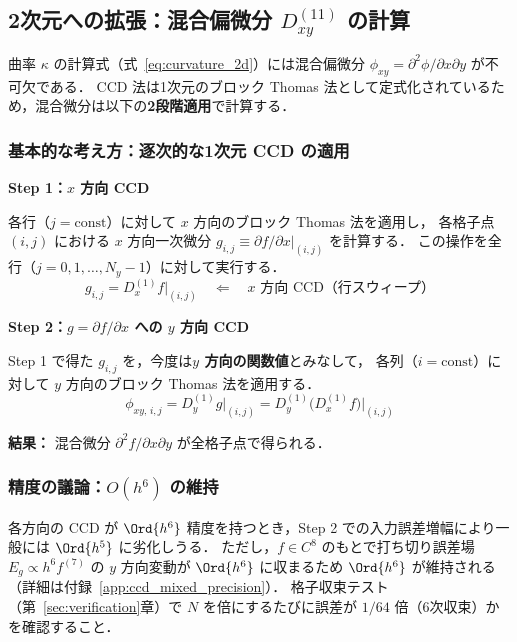 \subsection{2次元への拡張：混合偏微分 \texorpdfstring{$D_{xy}^{(11)}$}{Dxy\^{}(11)} の計算}
\label{sec:ccd_mixed}

曲率 $\kappa$ の計算式（式~\eqref{eq:curvature_2d}）には混合偏微分 $\phi_{xy} = \partial^2\phi/\partial x\partial y$ が不可欠である．
CCD 法は1次元のブロック Thomas 法として定式化されているため，混合微分は以下の\textbf{2段階適用}で計算する．

\subsubsection{基本的な考え方：逐次的な1次元 CCD の適用}

\begin{tcolorbox}[algbox, title={混合微分 $\partial^2 f/\partial x\partial y$ の計算手順}]
\textbf{Step 1：$x$ 方向 CCD}

各行（$j = \text{const}$）に対して $x$ 方向のブロック Thomas 法を適用し，
各格子点 $(i,j)$ における $x$ 方向一次微分 $g_{i,j} \equiv \partial f/\partial x \big|_{(i,j)}$ を計算する．
この操作を全行（$j = 0, 1, \ldots, N_y-1$）に対して実行する．
\[
  g_{i,j} = D_x^{(1)} f \big|_{(i,j)} \quad \Leftarrow \quad x \text{ 方向 CCD（行スウィープ）}
\]

\textbf{Step 2：$g = \partial f/\partial x$ への $y$ 方向 CCD}

Step 1 で得た $g_{i,j}$ を，今度は\textbf{$y$ 方向の関数値}とみなして，
各列（$i = \text{const}$）に対して $y$ 方向のブロック Thomas 法を適用する．
\[
  \phi_{xy,\,i,j} = D_y^{(1)} g \big|_{(i,j)} = D_y^{(1)}\bigl(D_x^{(1)} f\bigr)\big|_{(i,j)}
\]

\textbf{結果：} 混合微分 $\partial^2 f/\partial x \partial y$ が全格子点で得られる．
\end{tcolorbox}

\subsubsection{精度の議論：\texorpdfstring{$O(h^6)$}{O(h\textasciicircum 6)} の維持}

各方向の CCD が $\Ord{h^6}$ 精度を持つとき，Step 2 での入力誤差増幅により一般には $\Ord{h^5}$ に劣化しうる．
ただし，$f \in C^8$ のもとで打ち切り誤差場 $E_g \propto h^6 f^{(7)}$ の $y$ 方向変動が $\Ord{h^6}$ に収まるため $\Ord{h^6}$ が維持される
（詳細は付録~\ref{app:ccd_mixed_precision}）．
格子収束テスト（第~\ref{sec:verification}章）で $N$ を倍にするたびに誤差が $1/64$ 倍（6次収束）かを確認すること．


